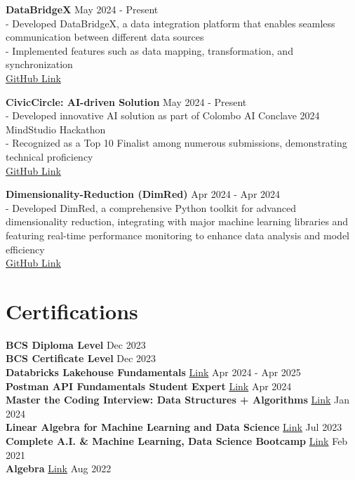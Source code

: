 \documentclass[10pt,letterpaper]{article}
\begin{document}
\textbf{DataBridgeX} \hfill May 2024 - Present \\
- Developed DataBridgeX, a data integration platform that enables seamless communication between different data sources \\
- Implemented features such as data mapping, transformation, and synchronization \\
\href{https://github.com/Programmer-RD-AI/DataBridgeX}{GitHub Link}

\textbf{CivicCircle: AI-driven Solution} \hfill May 2024 - Present \\
- Developed innovative AI solution as part of Colombo AI Conclave 2024 MindStudio Hackathon \\
- Recognized as a Top 10 Finalist among numerous submissions, demonstrating technical proficiency \\
\href{https://github.com/Programmer-RD-AI/CivicCircle}{GitHub Link}

\textbf{Dimensionality-Reduction (DimRed)} \hfill Apr 2024 - Apr 2024 \\
- Developed DimRed, a comprehensive Python toolkit for advanced dimensionality reduction, integrating with major machine learning libraries and featuring real-time performance monitoring to enhance data analysis and model efficiency \\
\href{https://github.com/Programmer-RD-AI/DimRed}{GitHub Link}

\section*{Certifications}
\textbf{BCS Diploma Level} \hfill Dec 2023 \\
\textbf{BCS Certificate Level} \hfill Dec 2023 \\
\textbf{Databricks Lakehouse Fundamentals} \href{https://credentials.databricks.com/9f3cd53f-a7e3-47f2-99b6-4aef820d3865#gs.9inie6}{Link} \hfill Apr 2024 - Apr 2025 \\
\textbf{Postman API Fundamentals Student Expert} \href{https://badgr.com/backpack/badges/6624b2dc97a0fe46e8e3d062}{Link} \hfill Apr 2024 \\
\textbf{Master the Coding Interview: Data Structures + Algorithms} \href{https://www.udemy.com/certificate/UC-b50ff995-c353-4e2c-be44-fa6afd6e404b/}{Link} \hfill Jan 2024 \\
\textbf{Linear Algebra for Machine Learning and Data Science} \href{https://www.coursera.org/account/accomplishments/certificate/NGWUQPH98QLR}{Link} \hfill Jul 2023 \\
\textbf{Complete A.I. \& Machine Learning, Data Science Bootcamp} \href{https://www.udemy.com/certificate/UC-bbb8d242-f6e7-4b05-b18a-d3d3b304e14d/}{Link} \hfill Feb 2021 \\
\textbf{Algebra} \href{https://www.udemy.com/certificate/UC-58dde7a0-83f1-4305-aa34-6208261a9ae6/}{Link} \hfill Aug 2022 
\end{document}
